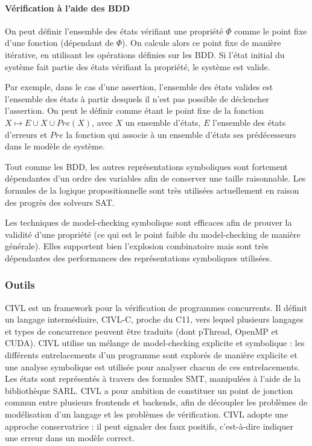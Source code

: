 \paragraph{Vérification à l'aide des BDD}

On peut définir l'ensemble des états vérifiant une propriété \(\Phi\)
comme le point fixe d'une fonction (dépendant de \(\Phi\)). On calcule
alors ce point fixe de manière itérative, en utilisant les opérations définies
sur les \ac{BDD}. Si l'état initial du système fait partie des états vérifiant la
propriété, le système est valide.

Par exemple, dans le cas d'une assertion, l'ensemble des états valides est
l'ensemble des états à partir desquels il n'est pas possible de déclencher
l'assertion. On peut le définir comme étant le point fixe de la fonction \(X
\mapsto E \cup X \cup Pre(X)\), avec \(X\) un ensemble d'états, \(E\) l'ensemble
des états d'erreurs et \(Pre\) la fonction qui associe à un ensemble d'états ses
prédécesseurs dans le modèle de système.

Tout comme les \ac{BDD}, les autres représentations symboliques sont fortement
dépendantes d'un ordre des variables afin de conserver une taille
raisonnable. Les formules de la logique propositionnelle sont très
utilisées actuellement en raison des progrès des solveurs SAT.

Les techniques de model-checking symbolique sont efficaces afin de
prouver la validité d'une propriété (ce qui est le point faible du
model-checking de manière générale). Elles supportent bien l'explosion
combinatoire mais sont très dépendantes des performances des
représentations symboliques utilisées.

\subsubsection{Outils}

CIVL\cite{CIVL} est un framework pour la vérification de programmes concurrents.
Il définit un langage intermédiaire, CIVL-C, proche du C11, vers lequel plusieurs
langages et types de concurrence peuvent être traduits (dont pThread, OpenMP et
CUDA). CIVL utilise un mélange de model-checking explicite et symbolique : les
différents entrelacements d'un programme sont explorés de manière explicite et
une analyse symbolique est utilisée pour analyser chacun de ces entrelacements.
Les états sont représentés à travers des formules SMT, manipulées à l'aide de la
bibliothèque SARL\cite{SARL}. CIVL a pour ambition de constituer un point de
jonction commun entre plusieurs frontends et backends, afin de découpler les
problèmes de modélisation d'un langage et les problèmes de vérification. CIVL
adopte une approche conservatrice : il peut signaler des faux positifs,
c'est-à-dire indiquer une erreur dans un modèle correct.

